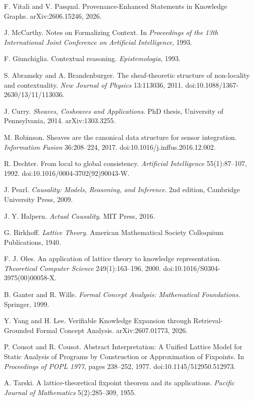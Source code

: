  F. Vitali and V. Pasqual. Provenance-Enhanced Statements in Knowledge Graphs. arXiv:2606.15246, 2026.

 J. McCarthy. Notes on Formalizing Context. In \emph{Proceedings of the 13th International Joint Conference on Artificial Intelligence}, 1993.

 F. Giunchiglia. Contextual reasoning. \emph{Epistemologia}, 1993.

 S. Abramsky and A. Brandenburger. The sheaf-theoretic structure of non-locality and contextuality. \emph{New Journal of Physics} 13:113036, 2011. doi:10.1088/1367-2630/13/11/113036.

 J. Curry. \emph{Sheaves, Cosheaves and Applications}. PhD thesis, University of Pennsylvania, 2014. arXiv:1303.3255.

 M. Robinson. Sheaves are the canonical data structure for sensor integration. \emph{Information Fusion} 36:208--224, 2017. doi:10.1016/j.inffus.2016.12.002.

 R. Dechter. From local to global consistency. \emph{Artificial Intelligence} 55(1):87--107, 1992. doi:10.1016/0004-3702(92)90043-W.

 J. Pearl. \emph{Causality: Models, Reasoning, and Inference}. 2nd edition, Cambridge University Press, 2009.

 J. Y. Halpern. \emph{Actual Causality}. MIT Press, 2016.

 G. Birkhoff. \emph{Lattice Theory}. American Mathematical Society Colloquium Publications, 1940.

 F. J. Oles. An application of lattice theory to knowledge representation. \emph{Theoretical Computer Science} 249(1):163--196, 2000. doi:10.1016/S0304-3975(00)00058-X.

 B. Ganter and R. Wille. \emph{Formal Concept Analysis: Mathematical Foundations}. Springer, 1999.

 Y. Yang and H. Lee. Verifiable Knowledge Expansion through Retrieval-Grounded Formal Concept Analysis. arXiv:2607.01773, 2026.

 P. Cousot and R. Cousot. Abstract Interpretation: A Unified Lattice Model for Static Analysis of Programs by Construction or Approximation of Fixpoints. In \emph{Proceedings of POPL 1977}, pages 238--252, 1977. doi:10.1145/512950.512973.

 A. Tarski. A lattice-theoretical fixpoint theorem and its applications. \emph{Pacific Journal of Mathematics} 5(2):285--309, 1955.
